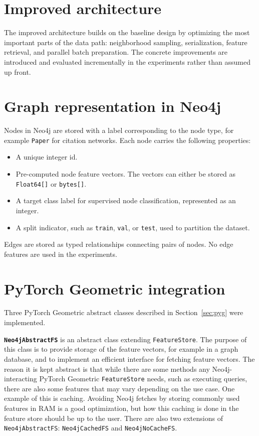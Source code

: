 \documentclass[PhD,single]{uclathes}
\begin{document}
\section{Improved architecture}
The improved architecture builds on the baseline design by optimizing the most
important parts of the data path: neighborhood sampling, serialization, feature
retrieval, and parallel batch preparation. The concrete improvements are
introduced and evaluated incrementally in the experiments rather than assumed
up front.

\section{Graph representation in Neo4j}\label{sec:graph_repr}
Nodes in Neo4j are stored with a label corresponding to the node type, for
example \texttt{Paper} for citation networks. Each node carries the following
properties:

\begin{itemize}
    \item A unique integer id.
    \item Pre-computed node feature vectors. The vectors can either be stored as \texttt{Float64[]} or \texttt{bytes[]}.
    \item A target class label for supervised node classification, represented as an integer.
    \item A split indicator, such as \texttt{train}, \texttt{val}, or \texttt{test}, used to partition the dataset.
\end{itemize}

Edges are stored as typed relationships connecting pairs of nodes. No edge
features are used in the experiments.

\section{PyTorch Geometric integration}\label{sec:pyg_impl}
Three PyTorch Geometric abstract classes described in Section~\ref{sec:pyg}
were implemented.

\noindent \textbf{\texttt{Neo4jAbstractFS}} is an abstract class extending
\texttt{FeatureStore}. The purpose of this class is to provide storage of the
feature vectors, for example in a graph database, and to implement an
efficient interface for fetching feature vectors. The reason it is kept
abstract is that while there are some methods any Neo4j-interacting PyTorch
Geometric \texttt{FeatureStore} needs, such as executing queries, there are
also some features that may vary depending on the use case. One example of
this is caching. Avoiding Neo4j fetches by storing commonly used features in
RAM is a good optimization, but how this caching is done in the feature store
should be up to the user. There are also two extensions of
\texttt{Neo4jAbstractFS}: \texttt{Neo4jCachedFS} and \texttt{Neo4jNoCacheFS}.
\end{document}
